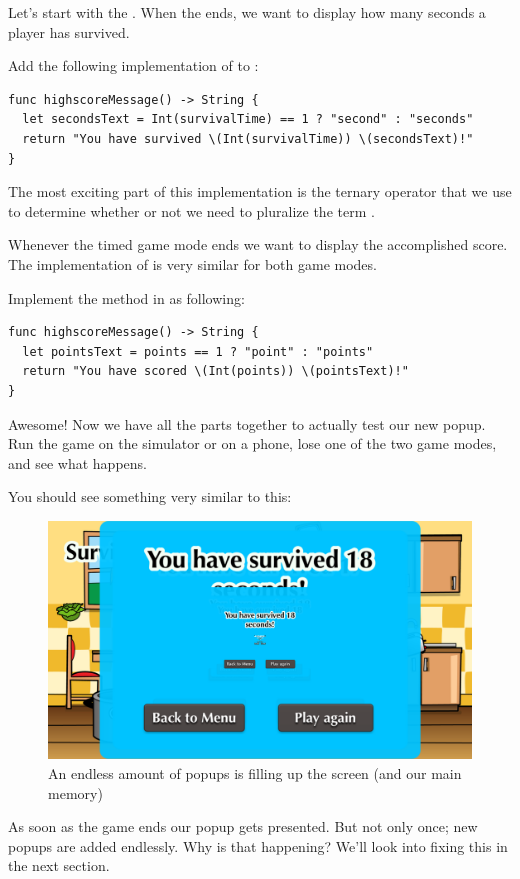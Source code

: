 Let's start with the . When the
 ends, we want to display how many seconds a player
has survived.

\begin{leftbar}
Add the following implementation of  to
:
\begin{lstlisting}
func highscoreMessage() -> String {
  let secondsText = Int(survivalTime) == 1 ? "second" : "seconds"
  return "You have survived \(Int(survivalTime)) \(secondsText)!"
}
\end{lstlisting}
\end{leftbar}
The most exciting part of this implementation is the ternary operator that we
use to determine whether or not we need to pluralize the term
. 

Whenever the timed game mode ends we want to display the accomplished score. The
implementation of  is very similar for both game
modes.
\begin{leftbar}
Implement the  method in 
as following:
\begin{lstlisting}
func highscoreMessage() -> String {
  let pointsText = points == 1 ? "point" : "points"
  return "You have scored \(Int(points)) \(pointsText)!"
}
\end{lstlisting}
\end{leftbar}
Awesome! Now we have all the parts together to actually test our new popup. Run
the game on the simulator or on a phone, lose one of the two game modes, and see
what happens.

You should see something very similar to this:
\begin{figure}[H]
    \centering
    \includegraphics[width=0.75\linewidth]{images/Chapter7/endless_popups.png}
    \caption{An endless amount of popups is filling up the screen (and our
    main memory)}
\end{figure}
As soon as the game ends our popup gets presented. But not only once; new
popups are added endlessly. Why is that happening? We'll look into fixing this
in the next section.

